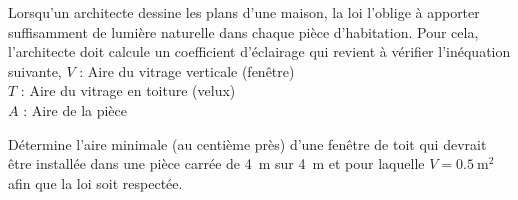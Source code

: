 %
%
    Lorsqu'un architecte dessine les plans d'une maison, la loi l'oblige à apporter suffisamment de lumière naturelle dans chaque pièce d'habitation. Pour cela, l'architecte doit calcule un coefficient d'éclairage qui revient à vérifier l'inéquation suivante,
    {%
        $V$ : Aire du vitrage verticale (fenêtre)\\
        $T$ : Aire du vitrage en toiture (velux)\\
        $A$ : Aire de la pièce
    }

    Détermine l'aire minimale (au centième près) d'une fenêtre de toit qui devrait être installée dans une pièce carrée de \SI{4}{\metre} sur \SI{4}{\metre} et pour laquelle $V=\SI{0,5}{\square\metre}$ afin que la loi soit respectée.



